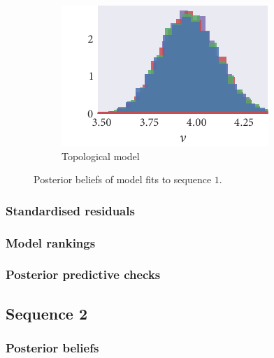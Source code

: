 \begin{figure}[p]
\begin{subfigure}[b]{\textwidth}
    \includegraphics{seq1/top_hist_nu.pdf}%
    \caption{Topological model}
  \end{subfigure}
  \caption{Posterior beliefs of model fits to sequence $1$.}
\end{figure}

\subsubsection{Standardised residuals}

\subsubsection{Model rankings}

\subsubsection{Posterior predictive checks}

\subsection{Sequence 2}

\subsubsection{Posterior beliefs}

